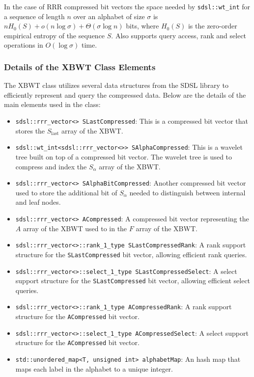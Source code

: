 In the case of RRR compressed bit vectors the space needed by \texttt{sdsl::wt\_int} for a sequence of length $n$ over an alphabet of size $\sigma$ is $nH_0(S) + o(n \log \sigma) + \Theta(\sigma \log n)$ bits, where $H_0(S)$ is the zero-order empirical entropy of the sequence $S$. Also supports query access, rank and select operations in $O(\log \sigma)$ time.

\subsubsection{Details of the XBWT Class Elements}
The XBWT class utilizes several data structures from the SDSL library to efficiently represent and query the compressed data. Below are the details of the main elements used in the class:

\begin{itemize}
    \item \texttt{sdsl::rrr\_vector<> SLastCompressed}: This is a compressed bit vector that stores the $S_{\text{last}}$ array of the XBWT. 
    \item \texttt{sdsl::wt\_int<sdsl::rrr\_vector<>> SAlphaCompressed}: This is a wavelet tree built on top of a compressed bit vector. The wavelet tree is used to compress and index the $S_{\alpha}$ array of the XBWT.
    \item \texttt{sdsl::rrr\_vector<> SAlphaBitCompressed}: Another compressed bit vector used to store the additional bit of $S_{\alpha}$ needed to distinguish between internal and leaf nodes.
    \item \texttt{sdsl::rrr\_vector<> ACompressed}: A compressed bit vector representing the $A$ array of the XBWT used to in the $F$ array of the XBWT.
    \item \texttt{sdsl::rrr\_vector<>::rank\_1\_type SLastCompressedRank}: A rank support structure for the \texttt{SLastCompressed} bit vector, allowing efficient rank queries.
    \item \texttt{sdsl::rrr\_vector<>::select\_1\_type SLastCompressedSelect}: A select support structure for the \texttt{SLastCompressed} bit vector, allowing efficient select queries.
    \item \texttt{sdsl::rrr\_vector<>::rank\_1\_type ACompressedRank}: A rank support structure for the \texttt{ACompressed} bit vector.
    \item \texttt{sdsl::rrr\_vector<>::select\_1\_type ACompressedSelect}: A select support structure for the \texttt{ACompressed} bit vector.
    \item \texttt{std::unordered\_map<T, unsigned int> alphabetMap}: An hash map that maps each label in the alphabet to a unique integer.

\end{itemize}
